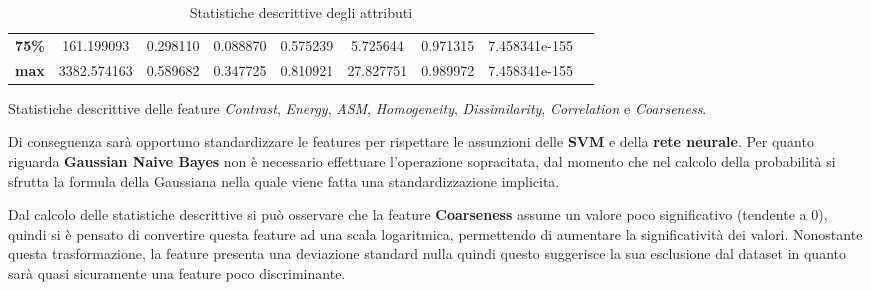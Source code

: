 \begin{table}[!ht]
\begin{subtable}[h]{1\textwidth}
{\begin{tabular}{c|c c c c c c c c}
                        \textbf{75\%}                                             & 161.199093        & 0.298110        & 0.088870     & 0.575239             & 5.725644               & 0.971315             & 7.458341e-155       \\
                        \textbf{max}                                              & 3382.574163       & 0.589682        & 0.347725     & 0.810921             & 27.827751              & 0.989972             & 7.458341e-155       \\ \hline
                  \end{tabular}}
            \caption{Statistiche descrittive delle feature \textit{Contrast}, \textit{Energy}, \textit{ASM}, \textit{Homogeneity}, \textit{Dissimilarity}, \textit{Correlation} e \textit{Coarseness}.}
            \label{tab:secondameta}
      \end{subtable}
      \caption{Statistiche descrittive degli attributi}
      \label{tab:desc-stat}
\end{table}
\newpage
Di conseguenza sarà opportuno standardizzare le features per rispettare le
assunzioni delle \textbf{SVM} e della \textbf{rete neurale}. Per quanto riguarda
\textbf{Gaussian Naive Bayes} non è necessario effettuare l'operazione
sopracitata, dal momento che nel calcolo della probabilità si sfrutta la formula
della Gaussiana nella quale viene fatta una standardizzazione implicita.

Dal calcolo delle statistiche descrittive si può osservare che la feature
\textbf{Coarseness} assume un valore poco significativo (tendente a $0$), quindi
si è pensato di convertire questa feature ad una scala logaritmica, permettendo
di aumentare la significatività dei valori. Nonostante questa trasformazione,
la feature presenta una deviazione standard nulla quindi questo suggerisce la
sua esclusione dal dataset in quanto sarà quasi sicuramente una feature poco
discriminante.

